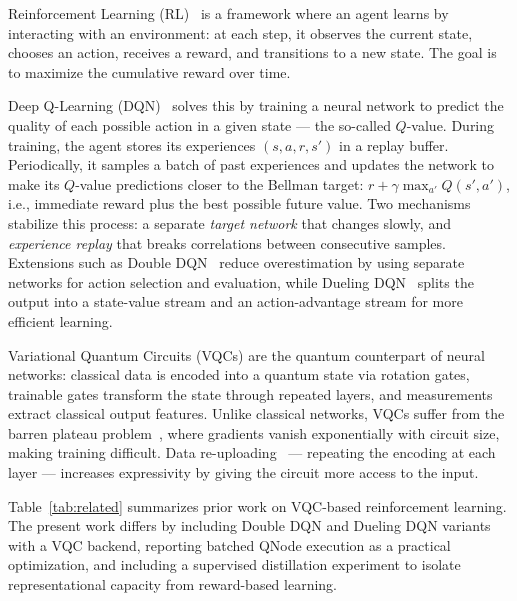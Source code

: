 Reinforcement Learning (RL)~\cite{sutton2018rl} is a framework where an agent
learns by interacting with an environment: at each step, it observes the current
state, chooses an action, receives a reward, and transitions to a new state.
The goal is to maximize the cumulative reward over time.

Deep Q-Learning (DQN)~\cite{mnih2015dqn} solves this by training a neural network
to predict the quality of each possible action in a given state — the so-called
$Q$-value. During training, the agent stores its experiences $(s, a, r, s')$ in
a replay buffer. Periodically, it samples a batch of past experiences and updates
the network to make its $Q$-value predictions closer to the Bellman target:
$r + \gamma \max_{a'} Q(s', a')$, i.e., immediate reward plus the best possible
future value. Two mechanisms stabilize this process: a separate \emph{target
network} that changes slowly, and \emph{experience replay} that breaks
correlations between consecutive samples. Extensions such as Double
DQN~\cite{vanhasselt2016double} reduce overestimation by using separate networks
for action selection and evaluation, while Dueling DQN~\cite{wang2016dueling}
splits the output into a state-value stream and an action-advantage stream for
more efficient learning.

Variational Quantum Circuits (VQCs) are the quantum counterpart of neural
networks: classical data is encoded into a quantum state via rotation gates,
trainable gates transform the state through repeated layers, and measurements
extract classical output features. Unlike classical networks, VQCs suffer from
the barren plateau problem~\cite{mcclean2018barren,cerezo2021cost}, where
gradients vanish exponentially with circuit size, making training difficult.
Data re-uploading~\cite{perez2020reuploading} — repeating the encoding at each
layer — increases expressivity by giving the circuit more access to the input.

Table~\ref{tab:related} summarizes prior work on VQC-based reinforcement
learning. The present work differs by including Double DQN and Dueling DQN
variants with a VQC backend, reporting batched QNode execution as a practical
optimization, and including a supervised distillation experiment to isolate
representational capacity from reward-based learning.

